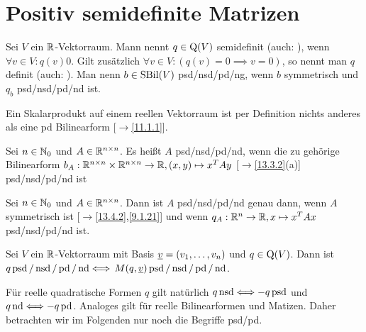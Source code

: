 \documentclass[../../main.tex]{subfiles}
\begin{document}
\section{Positiv semidefinite Matrizen}

\begin{df}\label{14.2.1}
Sei $V$ ein $\mathbb R$-Vektorraum. Mann nennt $q\in\operatorname{Q}(V)$  semidefinit (auch: ), wenn $\forall v\in V: q(v)$\case{$\ge$}{$\le$}$0$. Gilt zusätzlich $\forall v\in V: (q(v)=0\implies v=0)$, so nennt man $q$  definit (auch: ). Man nenn $b\in \operatorname{SBil}(V)$ psd/nsd/pd/ng, wenn $b$ symmetrisch und $q_b$ psd/nsd/pd/nd ist.
\end{df}

\begin{bsp}\label{14.2.2}
Ein Skalarprodukt auf einem reellen Vektorraum ist per Definition nichts anderes als eine pd Bilinearform [$\to$\ref{11.1.1}].
\end{bsp}
	
\begin{df}\label{14.2.3}
Sei $n\in \mathbb N_0$ und $A\in \mathbb R^{n\times n}$. Es heißt $A$ psd/nsd/pd/nd, wenn die zu gehörige Bilinearform $b_A: \mathbb R^{n\times n}\times \mathbb R^{n\times n}\to \mathbb R, (x,y)\mapsto x^TAy$ [$\to$\ref{13.3.2}(a)] psd/nsd/pd/nd ist
\end{df}

\begin{bem}\label{14.2.4}
Sei $n\in \mathbb N_0$ und $A\in \mathbb R^{n\times n}$. Dann ist $A$ psd/nsd/pd/nd genau dann, wenn $A$ symmetrisch ist [$\to$\ref{13.4.2},\ref{9.1.21}] und wenn $q_A: \mathbb R^n\to \mathbb R, x\mapsto x^TAx$ psd/nsd/pd/nd ist.
\end{bem}
	
\begin{bem}\label{14.2.5}
Sei $V$ ein $\mathbb R$-Vektorraum mit Basis ${\underline v}=(v_1,\ldots ,v_n)$ und $q\in\operatorname{Q}(V)$. Dann ist $q \operatorname{psd}/\operatorname{nsd}/\operatorname{pd}/\operatorname{nd} \Longleftrightarrow$ $M(q,{\underline v}) \operatorname{psd}/\operatorname{nsd}/\operatorname{pd}/\operatorname{nd}$.
\end{bem}

\begin{bem}\label{14.2.6}
Für reelle quadratische Formen $q$ gilt natürlich $q\operatorname{nsd}\Longleftrightarrow -q \operatorname{psd}$ und $q\operatorname{nd}\Longleftrightarrow -q \operatorname{pd}$. Analoges gilt für reelle Bilinearformen und Matizen. Daher betrachten wir im Folgenden nur noch die Begriffe psd/pd.
\end{bem}
\end{document}
